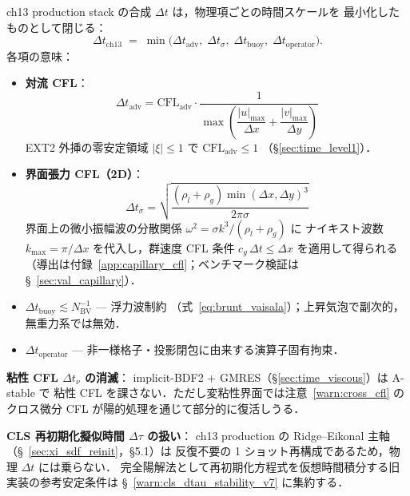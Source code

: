 ch13 production stack の合成 $\Delta t$ は，物理項ごとの時間スケールを
最小化したものとして閉じる：
\begin{equation}
  \Delta t_\text{ch13}
  \;=\; \min\!\bigl(\Delta t_\text{adv},\;
                    \Delta t_\sigma,\;
                    \Delta t_\text{buoy},\;
                    \Delta t_\text{operator}\bigr).
  \label{eq:dt_per_term}
\end{equation}
各項の意味：
\begin{itemize}[leftmargin=2em]
  \item \textbf{対流 CFL}：
        \begin{equation}
          \Delta t_\text{adv}
          = \mathrm{CFL}_\text{adv}\cdot
            \frac{1}{\max\!\left(\dfrac{|u|_{\max}}{\Delta x}+\dfrac{|v|_{\max}}{\Delta y}\right)}
          \label{eq:dt_adv}
        \end{equation}
        EXT2 外挿の零安定領域 $|\xi|\le 1$ で $\mathrm{CFL}_\text{adv}\le 1$
        （\S\ref{sec:time_level1}）．
  \item \textbf{界面張力 CFL（2D）}：
        \begin{equation}
          \Delta t_\sigma
          = \sqrt{\frac{(\rho_l + \rho_g)\min(\Delta x, \Delta y)^3}{2\pi\sigma}}
          \label{eq:dt_sigma}
        \end{equation}
        界面上の微小振幅波の分散関係 $\omega^2 = \sigma k^3/(\rho_l+\rho_g)$ に
        ナイキスト波数 $k_{\max}=\pi/\Delta x$ を代入し，群速度 CFL 条件
        $c_g\,\Delta t \le \Delta x$ を適用して得られる
        （導出は付録~\ref{app:capillary_cfl}；ベンチマーク検証は \S~\ref{sec:val_capillary}）．
  \item $\Delta t_\text{buoy} \lesssim N_\text{BV}^{-1}$ — 浮力波制約
        （式~\eqref{eq:brunt_vaisala}）；上昇気泡で副次的，無重力系では無効．
  \item $\Delta t_\text{operator}$ — 非一様格子・投影閉包に由来する演算子固有拘束．
\end{itemize}

\textbf{粘性 CFL $\Delta t_\nu$ の消滅}：
implicit-BDF2 + GMRES（§\ref{sec:time_viscous}）は A-stable で
粘性 CFL を課さない．ただし変粘性界面では注意~\ref{warn:cross_cfl} の
クロス微分 CFL が陽的処理を通じて部分的に復活しうる．

\textbf{CLS 再初期化擬似時間 $\Delta\tau$ の扱い}：
ch13 production の Ridge--Eikonal 主軸（\S~\ref{sec:xi_sdf_reinit}，§5.1）は
反復不要の 1 ショット再構成であるため，物理 $\Delta t$ には乗らない．
完全陽解法として再初期化方程式を仮想時間積分する旧実装の参考安定条件は
\S~\ref{warn:cls_dtau_stability_v7} に集約する．

